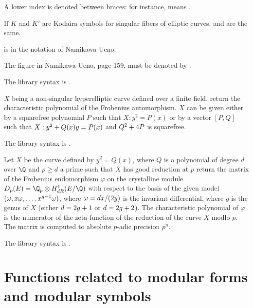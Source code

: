 
\item A lower index is denoted between braces: for instance,  means \kbd{[I\_2-II-5]}.

\item If $K$ and $K'$ are Kodaira symbols for singular fibers of elliptic
curves, \kbd{[$K$-$K'$-m]} and \kbd{[$K'$-$K$-m]} are the same.

\item \kbd{[$K$-$K'$-$-1$]}  is \kbd{[$K'$-$K$-$\alpha$]} in the notation of
Namikawa-Ueno.

\item The figure \kbd{[2I\_0-m]} in Namikawa-Ueno, page 159, must be denoted
by \kbd{[2I\_0-(m+1)]}.

The library syntax is .

\label{se:hyperellcharpoly}
$X$ being a non-singular hyperelliptic curve defined over a finite field,
return the characteristic polynomial of the Frobenius automorphism.
$X$ can be given either by a squarefree polynomial $P$ such that
$X: y^2 = P(x)$ or by a vector $[P,Q]$ such that
$X: y^2 + Q(x)\*y = P(x)$ and $Q^2+4\*P$ is squarefree.

The library syntax is .

\label{se:hyperellpadicfrobenius}
Let $X$ be the curve defined by $y^2=Q(x)$, where  $Q$ is a polynomial of
degree $d$ over $\Q$ and $p\ge d$ a prime such that $X$ has good reduction
at $p$ return the matrix of the Frobenius endomorphism $\varphi$ on the
crystalline module $D_p(E) = \Q_p \otimes H^1_{dR}(E/\Q)$ with respect to the
basis of the given model $(\omega, x\*\omega,\ldots,x^{g-1}\*\omega)$, where
$\omega = dx/(2\*y)$ is the invariant differential, where $g$ is the genus of
$X$ (either $d=2\*g+1$ or $d=2\*g+2$).  The characteristic polynomial of
$\varphi$ is the numerator of the zeta-function of the reduction of the curve
$X$ modlo $p$. The matrix is computed to absolute $p$-adic precision $p^n$.

The library syntax is .

\section{Functions related to modular forms and modular symbols}

